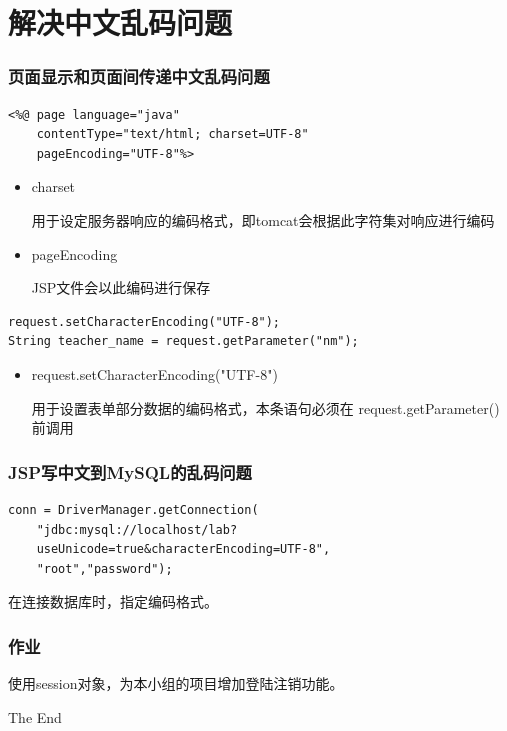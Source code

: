 \documentclass{beamer}
\begin{document}
\section{解决中文乱码问题}
\begin{frame}[fragile]
\frametitle{页面显示和页面间传递中文乱码问题}
\begin{lstlisting}
<%@ page language="java" 
    contentType="text/html; charset=UTF-8"
    pageEncoding="UTF-8"%>
\end{lstlisting}
\begin{itemize}
\item
charset

用于设定服务器响应的编码格式，即tomcat会根据此字符集对响应进行编码
\item
pageEncoding

JSP文件会以此编码进行保存
\end{itemize}
\begin{lstlisting}
request.setCharacterEncoding("UTF-8");
String teacher_name = request.getParameter("nm");
\end{lstlisting}
\begin{itemize}
\item
request.setCharacterEncoding("UTF-8")

用于设置表单部分数据的编码格式，本条语句必须在 request.getParameter()前调用
\end{itemize}
\end{frame}
\begin{frame}[fragile]
\frametitle{JSP写中文到MySQL的乱码问题}
\begin{lstlisting}
conn = DriverManager.getConnection(
    "jdbc:mysql://localhost/lab?
    useUnicode=true&characterEncoding=UTF-8",
    "root","password");
\end{lstlisting}
在连接数据库时，指定编码格式。				
\end{frame}
\begin{frame}
\frametitle{作业}

使用session对象，为本小组的项目增加登陆注销功能。
\end{frame}



\begin{frame}
\Huge{\centerline{The End}}
\end{frame}
\end{document}
